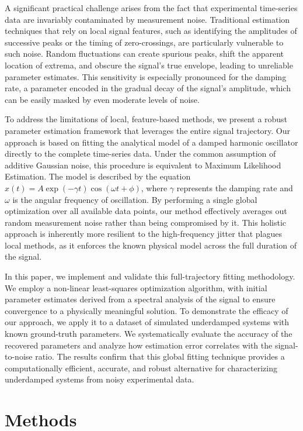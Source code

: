 \documentclass[]{article}
\begin{document}
A significant practical challenge arises from the fact that experimental time-series data are invariably contaminated by measurement noise. Traditional estimation techniques that rely on local signal features, such as identifying the amplitudes of successive peaks or the timing of zero-crossings, are particularly vulnerable to such noise. Random fluctuations can create spurious peaks, shift the apparent location of extrema, and obscure the signal's true envelope, leading to unreliable parameter estimates. This sensitivity is especially pronounced for the damping rate, a parameter encoded in the gradual decay of the signal's amplitude, which can be easily masked by even moderate levels of noise.

To address the limitations of local, feature-based methods, we present a robust parameter estimation framework that leverages the entire signal trajectory. Our approach is based on fitting the analytical model of a damped harmonic oscillator directly to the complete time-series data. Under the common assumption of additive Gaussian noise, this procedure is equivalent to Maximum Likelihood Estimation. The model is described by the equation $x(t) = A \exp(-\gamma t) \cos(\omega t + \phi)$, where $\gamma$ represents the damping rate and $\omega$ is the angular frequency of oscillation. By performing a single global optimization over all available data points, our method effectively averages out random measurement noise rather than being compromised by it. This holistic approach is inherently more resilient to the high-frequency jitter that plagues local methods, as it enforces the known physical model across the full duration of the signal.

In this paper, we implement and validate this full-trajectory fitting methodology. We employ a non-linear least-squares optimization algorithm, with initial parameter estimates derived from a spectral analysis of the signal to ensure convergence to a physically meaningful solution. To demonstrate the efficacy of our approach, we apply it to a dataset of simulated underdamped systems with known ground-truth parameters. We systematically evaluate the accuracy of the recovered parameters and analyze how estimation error correlates with the signal-to-noise ratio. The results confirm that this global fitting technique provides a computationally efficient, accurate, and robust alternative for characterizing underdamped systems from noisy experimental data.

\section{Methods}
\label{sec:methods}
\end{document}
